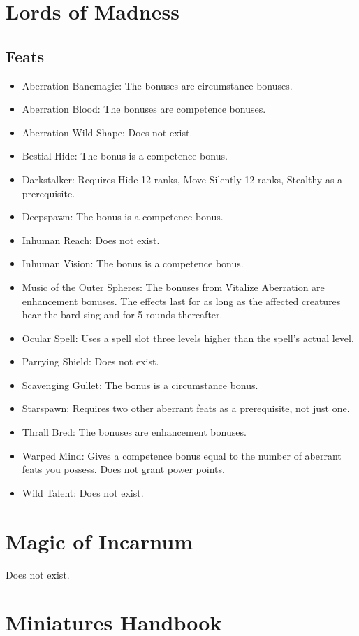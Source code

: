 \section{Lords of Madness}
\subsection{Feats}
\begin{itemize}
\item Aberration Banemagic: The bonuses are circumstance bonuses.
\item Aberration Blood: The bonuses are competence bonuses.
\item Aberration Wild Shape: Does not exist.
\item Bestial Hide: The bonus is a competence bonus.
\item Darkstalker: Requires Hide 12 ranks, Move Silently 12 ranks, Stealthy as a prerequisite.
\item Deepspawn: The bonus is a competence bonus.
\item Inhuman Reach: Does not exist.
\item Inhuman Vision: The bonus is a competence bonus.
\item Music of the Outer Spheres: The bonuses from Vitalize Aberration are enhancement bonuses. The effects last for as long as the affected creatures hear the bard sing and for 5 rounds thereafter.
\item Ocular Spell: Uses a spell slot three levels higher than the spell's actual level.
\item Parrying Shield: Does not exist.
\item Scavenging Gullet: The bonus is a circumstance bonus.
\item Starspawn: Requires two other aberrant feats as a prerequisite, not just one.
\item Thrall Bred: The bonuses are enhancement bonuses.
\item Warped Mind: Gives a competence bonus equal to the number of aberrant feats you possess. Does not grant power points.
\item Wild Talent: Does not exist.
\end{itemize}

\section{Magic of Incarnum}
Does not exist.

\section{Miniatures Handbook}
